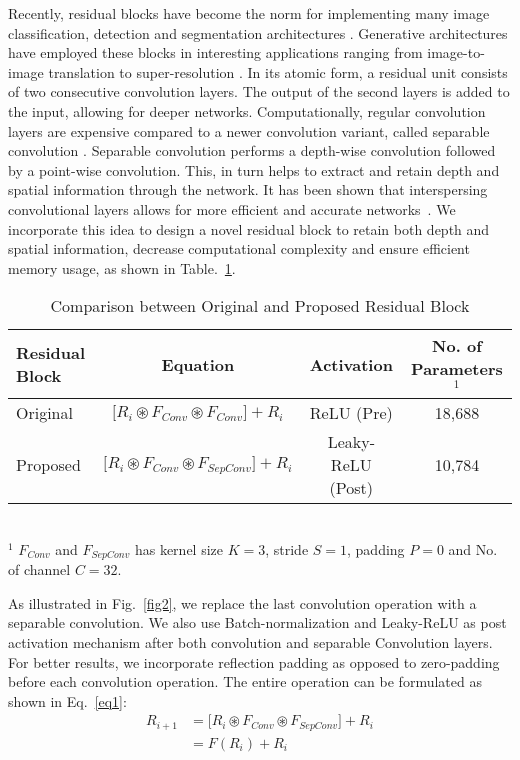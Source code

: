 \documentclass[a4paper,conference]{IEEEtran}
\begin{document}
Recently, residual blocks have become the norm for implementing many image classification, detection and segmentation architectures \cite{he2016deep,he2016identity}. Generative architectures have employed these blocks in interesting applications ranging from image-to-image translation to super-resolution \cite{johnson2016perceptual,wang2018high,ledig2017photo}. In its atomic form, a residual unit consists of two consecutive convolution layers. The output of the second layers is added to the input, allowing for deeper networks. Computationally, regular convolution layers are expensive compared to a newer convolution variant, called separable convolution \cite{chollet2017xception}. Separable convolution performs a depth-wise convolution followed by a point-wise convolution. This, in turn helps to extract and retain depth and spatial information through the network. It has been shown that interspersing convolutional layers allows for more efficient and accurate networks~\cite{opticnet19}. We incorporate this idea to design a novel residual block to retain both depth and spatial information, decrease computational complexity and ensure efficient memory usage, as shown in Table.~\ref{table1}.

\begin{table}[htb]
\caption{Comparison between Original and Proposed Residual Block}
    \label{table1}
\centering
\begin{tabular}{|l|c|c|c|} 
\hline
\small Residual Block & \small Equation & \small Activation & \small No. of Parameters$^{1}$\\
\hline\hline
\small Original
& \small $\big[R_{i}  \circledast F_{Conv} \circledast F_{Conv} \big] + R_{i}$ & \small ReLU (Pre) \cite{he2016identity}& \small 18,688 \\ 
\small Proposed  & \small $\big[R_{i}  \circledast F_{Conv} \circledast F_{SepConv} \big] + R_{i}$ &  \small Leaky-ReLU (Post) & \small 10,784\\ 
\hline
\end{tabular}
\footnotesize
\\$^1$ $F_{Conv}$ and $F_{SepConv}$ has kernel size $K=3$, stride $S=1$, padding $P=0$ and No. of channel $C=32$.
\end{table}



As illustrated in Fig.~\ref{fig2}, we replace the last convolution operation with a separable convolution. We also use Batch-normalization \cite{ioffe2015batch} and Leaky-ReLU as post activation mechanism after both convolution and separable Convolution layers. For better results, we incorporate reflection padding as opposed to zero-padding before each convolution operation. The entire operation can be formulated as shown in Eq.~\ref{eq1}:
\begin{equation}
\begin{split}
R_{i+1} &=  \big[R_{i}  \circledast F_{Conv} \circledast F_{SepConv} \big] + R_{i} 
\\ &=   F(R_{i}) + R_{i}
\label{eq1}
\end{split}
\end{equation}
\end{document}
